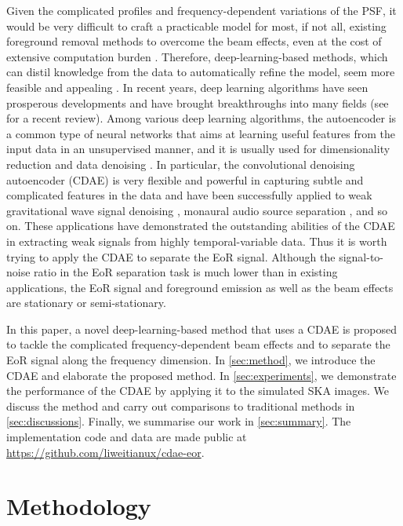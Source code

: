 \documentclass[fleqn,usenatbib]{mnras}
\newcommand{\editone}[1]{{\leavevmode\color{cyan}#1}}
\newcommand{\edittwo}[1]{{\leavevmode\color{magenta}#1}}
\begin{document}
Given the complicated profiles and frequency-dependent variations of
the PSF, it would be very difficult to craft a practicable model for most,
if not all, existing foreground removal methods to overcome the beam
effects, even at the cost of extensive computation burden
\citep[e.g.,][]{lochner2015}.
Therefore, deep-learning-based methods, which can distil knowledge from
the data to automatically refine the model, seem more feasible
and appealing \citep[e.g.,][]{herbel2018,vafaeiSadr2018}.
In recent years, deep learning algorithms have seen prosperous
developments and have brought breakthroughs into many fields
(see \citealt{lecun2015} for a recent review).
\edittwo{%
Among various deep learning algorithms, the autoencoder is a common type of
neural networks that aims at learning useful features from the input data
in an unsupervised manner, and it is usually used for dimensionality
reduction \citep[e.g.,][]{hinton2006,wang2014} and data denoising
\citep[e.g.,][]{xie2012,lu2013,bengio2013}.
In particular,}
the convolutional denoising autoencoder (CDAE) is very flexible and
powerful in capturing subtle and complicated features in the data and have
been successfully applied to weak gravitational wave signal denoising
\citep[e.g.,][]{shen2017}, monaural audio source separation
\citep[e.g.,][]{grais2017}, and so on.
These applications have demonstrated the outstanding abilities of the
CDAE in extracting weak signals from highly temporal-variable data.
Thus it is worth trying to apply the CDAE to separate the EoR signal.
Although the signal-to-noise ratio in the EoR separation task is much lower
than in existing applications, the EoR signal and foreground emission as
well as the beam effects are stationary or semi-stationary.

In this paper, a novel deep-learning-based method that uses a CDAE
is proposed to tackle the complicated frequency-dependent beam effects
and to separate the EoR signal along the frequency dimension.
In \autoref{sec:method}, we introduce the CDAE and elaborate
the proposed method.
In \autoref{sec:experiments}, we demonstrate the performance of the
CDAE by applying it to the simulated SKA images.
We discuss the method and carry out
\editone{comparisons to traditional methods}
in \autoref{sec:discussions}.
Finally, we summarise our work in \autoref{sec:summary}.
The implementation code and data are made public at
\url{https://github.com/liweitianux/cdae-eor}.


\section{Methodology}
\label{sec:method}
\end{document}
